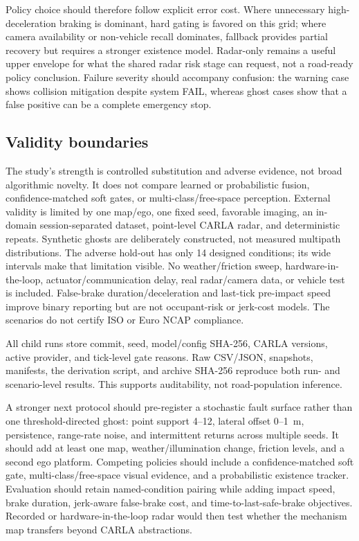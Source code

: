 \documentclass[conference]{IEEEtran}
\begin{document}
Policy choice should therefore follow explicit error cost. Where unnecessary
high-deceleration braking is dominant, hard gating is favored on this grid; where
camera availability or non-vehicle recall dominates, fallback provides partial
recovery but requires a stronger existence model. Radar-only remains a useful
upper envelope for what the shared radar risk stage can request, not a road-ready
policy conclusion. Failure severity should accompany confusion: the warning
case shows collision mitigation despite system FAIL, whereas ghost cases show
that a false positive can be a complete emergency stop.

\subsection{Validity boundaries}
The study's strength is controlled substitution and adverse evidence, not broad
algorithmic novelty. It does not compare learned or probabilistic fusion,
confidence-matched soft gates, or multi-class/free-space perception. External
validity is limited by one map/ego, one fixed seed, favorable imaging, an
in-domain session-separated dataset, point-level CARLA radar, and deterministic
repeats. Synthetic ghosts are deliberately constructed, not measured
multipath distributions. The adverse hold-out has only 14 designed conditions;
its wide intervals make that limitation visible. No weather/friction sweep,
hardware-in-the-loop, actuator/communication delay, real radar/camera data, or
vehicle test is included. False-brake duration/deceleration and last-tick
pre-impact speed improve binary reporting but are not occupant-risk or jerk-cost
models. The scenarios do not certify ISO or Euro NCAP compliance.

All child runs store commit, seed, model/config SHA-256, CARLA versions, active
provider, and tick-level gate reasons. Raw CSV/JSON, snapshots, manifests, the
derivation script, and archive SHA-256 reproduce both run- and scenario-level
results. This supports auditability, not road-population inference.

A stronger next protocol should pre-register a stochastic fault surface rather
than one threshold-directed ghost: point support 4--12, lateral offset
0--1~m, persistence, range-rate noise, and intermittent returns across multiple
seeds. It should add at least one map, weather/illumination change, friction
levels, and a second ego platform. Competing policies should include a
confidence-matched soft gate, multi-class/free-space visual evidence, and a
probabilistic existence tracker. Evaluation should retain named-condition
pairing while adding impact speed, brake duration, jerk-aware false-brake cost,
and time-to-last-safe-brake objectives. Recorded or hardware-in-the-loop radar
would then test whether the mechanism map transfers beyond CARLA abstractions.
\end{document}
